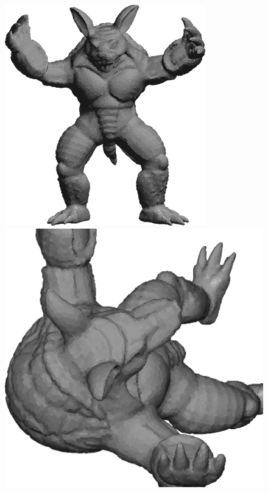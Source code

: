 \begin{figure}[!h]
    \centering
    \centering
    \includegraphics[scale=0.3]{images/armadillo-extendfs.png}
    \endminipage\hfill
    \centering
    \includegraphics[scale=0.3]{images/armadillo-extendfs-1.png}
    \endminipage\hfill
    \centering

\end{figure}
